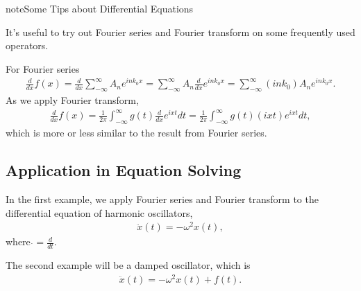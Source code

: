 \documentclass[letterpaper,10pt,english]{sphinxmanual}
\begin{document}
\begin{sphinxadmonition}{note}{Some Tips about Differential Equations}

It’s useful to try out Fourier series and Fourier transform on some frequently used operators.

For Fourier series
\begin{equation*}
\begin{split}\frac{d}{dx}f(x) = \frac{d}{dx}\sum_{-\infty}^\infty A_n e^{i n k_0 x } = \sum_{-\infty}^\infty A_n \frac{d}{dx} e^{i n k_0 x } = \sum_{-\infty}^\infty (i n k_0) A_n  e^{i n k_0 x }.\end{split}
\end{equation*}
As we apply Fourier transform,
\begin{equation*}
\begin{split}\frac{d}{dx}f(x) = \frac{1}{2\pi}\int_{-\infty}^\infty g(t) \frac{d}{dx} e^{i x t} dt = \frac{1}{2\pi} \int_{-\infty}^\infty g(t) (i x t)e^{i x t} dt,\end{split}
\end{equation*}
which is more or less similar to the result from Fourier series.
\end{sphinxadmonition}


\subsection{Application in Equation Solving}
\label{\detokenize{equation-solving-in-neuroscience/fourier-transform:application-in-equation-solving}}

In the first example, we apply Fourier series and Fourier transform to the differential equation of harmonic oscillators,
\label{\detokenize{equation-solving-in-neuroscience/fourier-transform:equation-eqn-harmonic-oscillator-eom}}\begin{equation}\label{equation:equation-solving-in-neuroscience/fourier-transform:eqn-harmonic-oscillator-eom}
\begin{split}\ddot x(t) = - \omega^2 x(t),\end{split}
\end{equation}
where \(\dot {} = \frac{d}{dt}\).

The second example will be a damped oscillator, which is
\label{\detokenize{equation-solving-in-neuroscience/fourier-transform:equation-eqn-damped-harmonic-oscillator-eom}}\begin{equation}\label{equation:equation-solving-in-neuroscience/fourier-transform:eqn-damped-harmonic-oscillator-eom}
\begin{split}\ddot x(t) = - \omega^2 x(t) + f(t).\end{split}
\end{equation}
\end{document}
